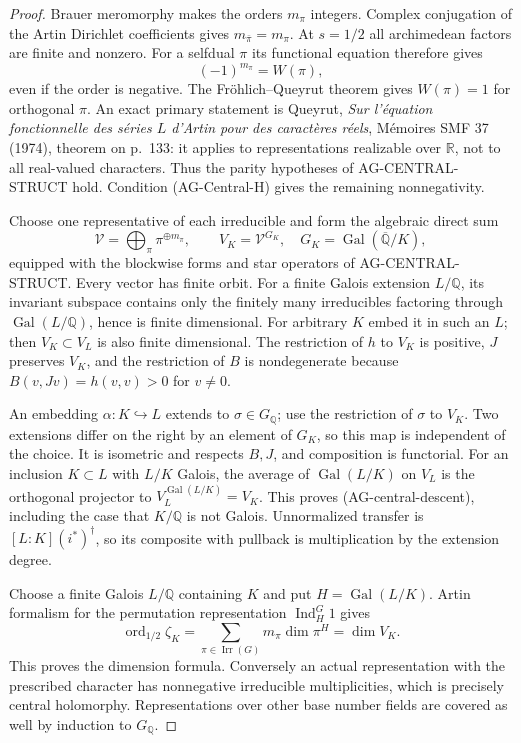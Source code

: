 \begin{proof}
Brauer meromorphy makes the orders $m_\pi$ integers.
Complex conjugation of the Artin Dirichlet coefficients gives
$m_{\bar\pi}=m_\pi$.  At $s=1/2$ all archimedean factors are
finite and nonzero.  For a selfdual $\pi$ its functional
equation therefore gives
\[
                        (-1)^{m_\pi}=W(\pi),             \tag{AG-central-parity}
\]
even if the order is negative.  The Fröhlich--Queyrut theorem
gives $W(\pi)=1$ for orthogonal $\pi$.  An exact primary
statement is Queyrut, \emph{Sur l'équation fonctionnelle des
séries $L$ d'Artin pour des caractères réels}, Mémoires SMF 37
(1974), theorem on p.~133: it applies to representations
realizable over $\mathbb R$, not to all real-valued characters.
Thus the parity hypotheses of AG-CENTRAL-STRUCT hold.
Condition (AG-Central-H) gives the remaining nonnegativity.

Choose one representative of each irreducible and form the
algebraic direct sum
\[
 \mathcal V=\bigoplus_\pi \pi^{\oplus m_\pi},\qquad
                V_K=\mathcal V^{G_K},
 \quad G_K=\operatorname{Gal}(\overline{\mathbb Q}/K),  \tag{AG-central-construction}
\]
equipped with the blockwise forms and star operators of
AG-CENTRAL-STRUCT.  Every vector has finite orbit.  For a
finite Galois extension $L/\mathbb Q$, its invariant subspace
contains only the finitely many irreducibles factoring through
$\operatorname{Gal}(L/\mathbb Q)$, hence is finite dimensional.
For arbitrary $K$ embed it in such an $L$; then $V_K\subset V_L$
is also finite dimensional.  The restriction of $h$ to $V_K$
is positive, $J$ preserves $V_K$, and the restriction of $B$
is nondegenerate because $B(v,Jv)=h(v,v)>0$ for $v\ne0$.

An embedding $\alpha:K\hookrightarrow L$ extends to
$\sigma\in G_{\mathbb Q}$; use the restriction of $\sigma$
to $V_K$.  Two extensions differ on the right by an element
of $G_K$, so this map is independent of the choice.  It is
isometric and respects $B,J$, and composition is functorial.
For an inclusion $K\subset L$ with $L/K$ Galois, the average
of $\operatorname{Gal}(L/K)$ on $V_L$ is the orthogonal
projector to $V_L^{\operatorname{Gal}(L/K)}=V_K$.
This proves (AG-central-descent), including the case that
$K/\mathbb Q$ is not Galois.  Unnormalized transfer is
$[L:K](i^*)^\dagger$, so its composite with pullback is
multiplication by the extension degree.

Choose a finite Galois $L/\mathbb Q$ containing $K$ and put
$H=\operatorname{Gal}(L/K)$.  Artin formalism for the
permutation representation $\operatorname{Ind}_H^G1$ gives
\[
 \operatorname{ord}_{1/2}\zeta_K
       =\sum_{\pi\in\operatorname{Irr}(G)}
                    m_\pi\dim\pi^H
       =\dim V_K.
\]
This proves the dimension formula.  Conversely an actual
representation with the prescribed character has nonnegative
irreducible multiplicities, which is precisely central
holomorphy.  Representations over other base number fields
are covered as well by induction to $G_{\mathbb Q}$.


\end{proof}

